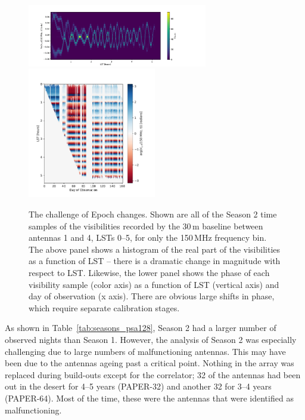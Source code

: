 \begin{figure}
\centering
\includegraphics[width=0.7\textwidth]{chapters/psa128_pol/figures/S2_chan100_hist.pdf}
\includegraphics[width=0.5\textwidth]{chapters/psa128_pol/figures/S2_chan100_phasegrid.pdf}
\caption[The challenge of Epoch changes.]{The challenge of Epoch changes. Shown are all of the Season 2 time samples of the visibilities recorded by the 30\,m baseline between antennas 1 and 4, LSTs 0--5, for only the 150\,MHz frequency bin. The above panel shows a histogram of the real part of the visibilities as a function of LST -- there is a dramatic change in magnitude with respect to LST. Likewise, the lower panel shows the phase of each visibility sample (color axis) as a function of LST (vertical axis) and day of observation (x axis). There are obvious large shifts in phase, which require separate calibration stages.}
\label{fig:psa128_epochs}
\end{figure}

As shown in Table~\ref{tab:seasons_psa128}, Season 2 had a larger number of observed nights than Season 1. However, the analysis of Season 2 was especially challenging due to large numbers of malfunctioning antennas. This may have been due to the antennas ageing past a critical point. Nothing in the array was replaced during build-outs except for the correlator; 32 of the antennas had been out in the desert for 4--5 years (PAPER-32) and another 32 for 3--4 years (PAPER-64). Most of the time, these were the antennas that were identified as malfunctioning.

